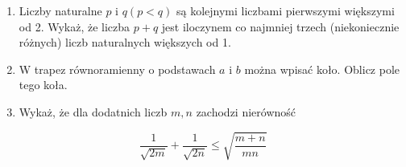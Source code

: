 \documentclass[10pt]{article}
\begin{document}
\begin{enumerate}
  \item Liczby naturalne \(p\) i \(q(p<q)\) są kolejnymi liczbami pierwszymi większymi od 2. Wykaż, że liczba \(p+q\) jest iloczynem co najmniej trzech (niekoniecznie różnych) liczb naturalnych większych od 1.
  \item W trapez równoramienny o podstawach \(a\) i \(b\) można wpisać koło. Oblicz pole tego koła.
  \item Wykaż, że dla dodatnich liczb \(m, n\) zachodzi nierówność
\end{enumerate}

\[
\frac{1}{\sqrt{2 m}}+\frac{1}{\sqrt{2 n}} \leq \sqrt{\frac{m+n}{m n}}
\]
\end{document}
